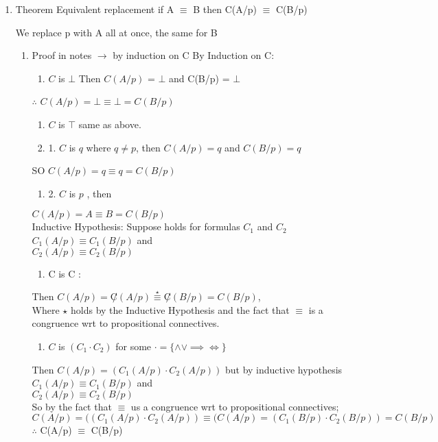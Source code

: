 \documentclass[11pt]{article}
\begin{document}
\begin{enumerate}
\item Theorem Equivalent replacement
\label{sec:org85e75f6}
if A \(\equiv\) B then C(A/p) \(\equiv\) C(B/p) 

We replace p with A all at once, the same for B
\begin{enumerate}
\item Proof in notes \(\rightarrow\) by induction on C
\label{sec:orgff33bc4}
By Induction on C: 
\begin{enumerate}
\item \(C\) is \(\bot\) Then  \(C(A/p)\) = \(\bot\) and C(B/p) = \(\bot\) \\
\end{enumerate}
\(\therefore\)  \(C(A/p) = \bot \equiv \bot = C(B/p)\)
\begin{enumerate}
\item \(C\) is \(\top\) same as above.
\item 1. \(C\)  is \(q\) where \(q \neq  p\), then \(C(A/p) = q\) and \(C(B/p) = q\) \\
\end{enumerate}
SO \(C(A/p) = q \equiv q = C(B/p)\)
\begin{enumerate}
\item 2. \(C\) is \(p\) , then \\
\end{enumerate}
\(C(A/p) = A \equiv B = C(B/p)\) \\
Inductive Hypothesis:  Suppose holds for formulas \(C_1\) and \(C_2\) \\
\(C_1 (A/p) \equiv C_1 (B/p)\) and \\
\(C_2(A/p) \equiv C_2(B/p)\) 
\begin{enumerate}
\item C  is \textlnot{} C : \\
\end{enumerate}
Then \(C(A/p) = \not C(A/p) \overset{\star}{\equiv} \not C(B/p) =C(B/p)\), \\
Where \(\star\) holds by the Inductive Hypothesis and the fact that \(\equiv\) is a congruence wrt to propositional connectives. 
\begin{enumerate}
\item \(C\) is \((C_1 \cdot C_2)\) for some \(\cdot = \{\land \lor \implies \iff \}\) \\
\end{enumerate}
Then \(C(A/p) = (C_1(A/p) \cdot C_2(A/p))\) but by inductive hypothesis \\
\(C_1 (A/p) \equiv C_1 (B/p)\) and \\
\(C_2(A/p) \equiv C_2(B/p)\)  \\
So by the fact that \(\equiv\) us a congruence wrt to propositional connectives; \\
\(C(A/p) = ((C_1(A/p) \cdot C_2(A/p))\equiv(C(A/p) = (C_1(B/p) \cdot C_2(B/p))=C(B/p)\) \\
\(\therefore\) C(A/p) \(\equiv\) C(B/p)
\end{enumerate}
\end{enumerate}
\end{document}
